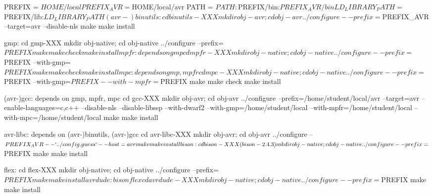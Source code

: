 PREFIX = $HOME/local
PREFIX_AVR = $HOME/local/avr
PATH = $PATH:$PREFIX/bin:$PREFIX_AVR/bin
LD_LIBRARY_PATH = $PREFIX/lib:$LD_LIBRARY_PATH

(avr-)binutils:
cd binutils-XXX
mkdir obj-avr; cd obj-avr
../configure --prefix=$PREFIX_AVR --target=avr --disable-nls
make
make install


gmp:
cd gmp-XXX
mkdir obj-native; cd obj-native
../configure --prefix=$PREFIX
make
make check
make install

mpfr: depends on gmp
cd mpfr-XXX
mkdir obj-native; cd obj-native
../configure --prefix=$PREFIX --with-gmp=$PREFIX
make
make check
make install

mpc: depends on gmp, mpfr
cd mpc-XXX
mkdir obj-native; cd obj-native
../configure --prefix=$PREFIX --with-gmp=$PREFIX --with-mpfr=$PREFIX
make
make check
make install

(avr-)gcc: depends on gmp, mpfr, mpc
cd gcc-XXX
mkdir obj-avr; cd obj-avr
../configure --prefix=/home/student/local/avr --target=avr --enable-languages=c,c++ --disable-nls --disable-libssp --with-dwarf2 --with-gmp=/home/student/local --with-mpfr=/home/student/local --with-mpc=/home/student/local
make
make install

avr-libc: depends on (avr-)binutils, (avr-)gcc
cd avr-libc-XXX
mkdir obj-avr; cd obj-avr
../configure --$PREFIX_AVR --`../config.guess` --host=avr
make
make install

bison:
cd bison-XXX (bison-2.4.3)
mkdir obj-native; cd obj-native
../configure --prefix=$PREFIX
make
make install

flex:
cd flex-XXX
mkdir obj-native; cd obj-native
../configure --prefix=$PREFIX
make
make install

avrdude: bison flex
cd avrdude-XXX
mkdir obj-native; cd obj-native
../configure --prefix=$PREFIX
make
make install
